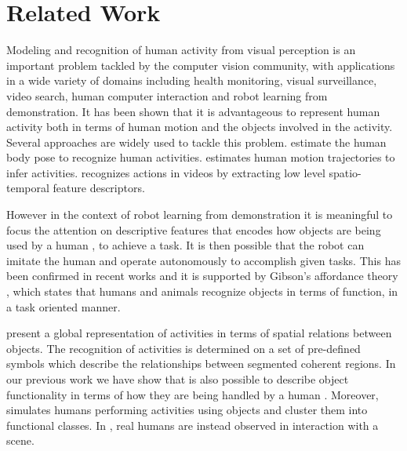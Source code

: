 \section{Related Work}
\label{sec:relatedwork}


Modeling and recognition of human activity from visual perception is an important problem tackled by the computer vision community, with applications in a wide variety of domains including health monitoring, visual surveillance, video search, human computer interaction and robot learning from demonstration. It has been shown \cite{desai10,gupta09a,kjellstrombook11,kjellstromCVIU11,laptev08,moore99,peursum05,veloso05,wu07} that it is advantageous to represent human activity both in terms of human motion and the objects involved in the activity. Several approaches are widely used to tackle this problem. \cite{Sapp10,AslamBB10a} estimate the human body pose  to recognize human activities. \cite{Bobick01} estimates human motion trajectories to infer activities. \cite{Laptev03} recognizes actions in videos by extracting low level spatio-temporal feature descriptors. 

However in the context of robot learning from demonstration it is meaningful to focus the attention on descriptive features that encodes how objects are being used by a human \cite{billard08},\cite{lang-toussaint10} to achieve a task. It is then possible that the robot can imitate the human and operate autonomously to accomplish given tasks. This has been confirmed in recent works  \cite{gall11,grabner11,rivlin95,stark-bowyer96,sutton-stark08,turek10} and it is supported by Gibson's affordance theory \cite{gibson79}, which states that humans and animals recognize objects in terms of function, in a task oriented manner.

\cite{aksoy10,luo11} present a global representation of activities in terms of spatial relations between objects. The recognition of activities is determined on a set of pre-defined symbols which describe the relationships between segmented coherent regions. In our previous work we have show that is also possible to describe object functionality in terms of how they are being handled by a human \cite{pieropan13}.
Moreover, \cite{grabner11} simulates humans performing activities using objects and cluster them into functional classes. In \cite{gupta11,moldovan12,gall11}, real humans are instead observed in interaction with a scene.

